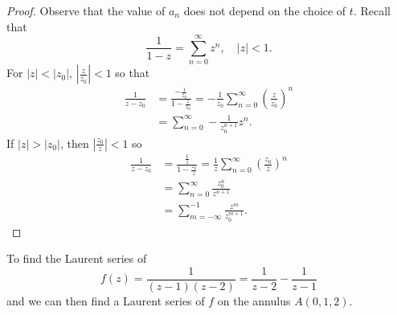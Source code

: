 \begin{proof}
Observe that the value of $a_n$ does not depend on the choice of $t$.
Recall that
$$
\frac{1}{1 - z} = \sum_{n=0}^\infty z^n, \quad |z| < 1.
$$
For $|z| < |z_0|$, $\left|\frac{z}{z_0}\right| < 1$ so that
\begin{align*}
   \frac{1}{z - z_0}
&= \frac{-\frac{1}{z_0}}{1 - \frac{z}{z_0}}
 = -\frac{1}{z_0} \sum_{n=0}^\infty \left(\frac{z}{z_0}\right)^n \\
&= \sum_{n=0}^\infty -\frac{1}{z_0^{n+1}} z^n.
\end{align*}
If $|z| > |z_0|$, then $\left|\frac{z_0}{z}\right| < 1$ so
\begin{align*}
   \frac{1}{z - z_0}
&= \frac{\frac{1}{z}}{1 - \frac{z_0}{z}}
 = \frac{1}{z}
   \sum_{n=0}^\infty
     \left(\frac{z_0}{z}\right)^n \\
&= \sum_{n=0}^\infty
     \frac{z_0^n}{z^{n+1}} \\
&= \sum_{m=-\infty}^{-1} \frac{z^m}{z_0^{m+1}}.
\end{align*}

\end{proof}

To find the Laurent series of
$$
  f(z)
= \frac{1}{(z-1)(z-2)}
= \frac{1}{z - 2} - \frac{1}{z - 1}
$$
and we can then find a Laurent series of $f$
on the annulus $A(0, 1, 2)$.